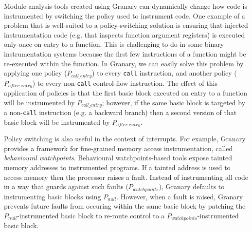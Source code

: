 \documentclass[letterpaper,twocolumn,10pt]{article}
\begin{document}
Module analysis tools created using Granary can dynamically change how code is instrumented by switching the policy used to instrument code. One example of a problem that is well-suited to a policy-switching solution is ensuring that injected instrumentation code (e.g. that inspects function argument registers) is executed only once on entry to a function. This is challenging to do in some binary instrumentation systems because the first few instructions of a function might be re-executed within the function. In Granary, we can easily solve this problem by applying one policy ($P_{call\_entry}$)  to every \texttt{call} instruction, and another policy ($P_{after\_entry}$) to every non-\texttt{call} control-flow instruction.  The effect of this application of policies is that the first basic block executed on entry to a function will be instrumented by $P_{call\_entry}$; however, if the same basic block is targeted by a non-\texttt{call} instruction (e.g. a backward branch) then a second version of that basic block will be instrumented by $P_{after\_entry}$.


Policy switching is also useful in the context of interrupts. For example, Granary provides a framework for fine-grained memory access instrumentation, called \emph{behavioural watchpoints}. Behavioural watchpoints-based tools expose tainted memory addresses to instrumented programs. If a tainted address is used to access memory then the processor raises a fault. Instead of instrumenting all code in a way that guards against such faults ($P_{watchpoints}$), Granary defaults to instrumenting basic blocks using $P_{null}$. However, when a fault is raised, Granary prevents future faults from occuring within the same basic block by patching the $P_{null}$-instrumented basic block to re-route control to a $P_{watchpoints}$-instrumented basic block.
\end{document}
